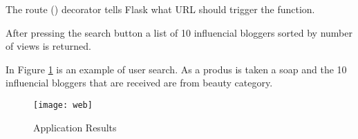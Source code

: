 The route () decorator tells Flask what URL should trigger the function. 

After pressing the search button a list of 10 influencial bloggers sorted by number of views is returned. 

In Figure \ref{web_app} is an example of user search. As a produs is taken a soap and the 10 influencial bloggers that are received are from beauty category.

\begin{figure}[!ht]
\centering
\texttt{[image: web]}
\caption{Application Results}\label{web_app}
\end{figure}






